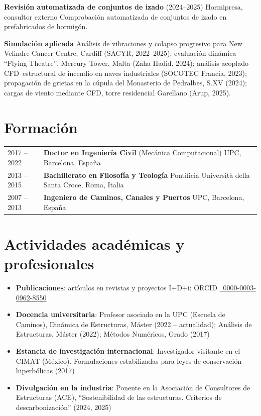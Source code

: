 \documentclass[12pt]{article}
\begin{document}
\parbox{\linewidth}{
    \textbf{Revisión automatizada de conjuntos de izado} (2024--2025) Hormipresa, consultor externo \newline
    Comprobación automatizada de conjuntos de izado en prefabricados de hormigón.}

\parbox{\linewidth}{
    \textbf{Simulación aplicada} 
    Análisis de vibraciones y colapso progresivo para New Velindre Cancer Centre, Cardiff (SACYR, 2022--2025);
    evaluación dinámica ``Flying Theatre'', Mercury Tower, Malta (Zaha Hadid, 2024);
    análisis acoplado CFD--estructural de incendio en naves industriales (SOCOTEC Francia, 2023);
    propagación de grietas en la cúpula del Monasterio de Pedralbes, S.XV (2024);
    cargas de viento mediante CFD, torre residencial Garellano (Arup, 2025).}


\section{Formación}
\begin{tabularx}{\linewidth}{lX}
    2017 -- 2022 &
    \textbf{Doctor en Ingeniería Civil} (Mecánica Computacional) \newline
    UPC, Barcelona, España \\

    2013 -- 2015 &
    \textbf{Bachillerato en Filosofía y Teología} \newline
    Pontificia Università della Santa Croce, Roma, Italia \\

    2007 -- 2013 &
    \textbf{Ingeniero de Caminos, Canales y Puertos} \newline
    UPC, Barcelona, España \\
\end{tabularx}


\section{Actividades académicas y profesionales}
\begin{itemize}
    \item \textbf{Publicaciones}: artículos en revistas y proyectos I+D+i: ORCID \href{https://orcid.org/0000-0003-0962-8550}{\faOrcid \ 0000-0003-0962-8550}
    \item \textbf{Docencia universitaria}: Profesor asociado en la UPC (Escuela de Caminos), Dinámica de Estructuras, Máster (2022 -- actualidad); Análisis de Estructuras, Máster (2022); Métodos Numéricos, Grado (2017)
    \item \textbf{Estancia de investigación internacional}: Investigador visitante en el CIMAT (México). Formulaciones estabilizadas para leyes de conservación hiperbólicas (2017)
    \item \textbf{Divulgación en la industria}: Ponente en la Asociación de Consultores de Estructuras (ACE), ``Sostenibilidad de las estructuras. Criterios de descarbonización'' (2024, 2025)
\end{itemize}
\end{document}
